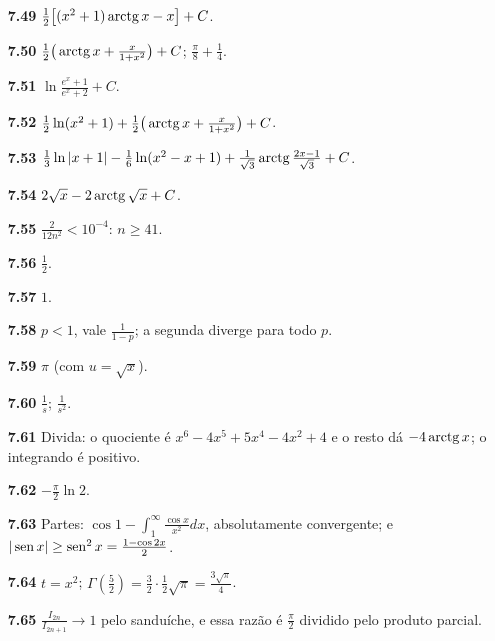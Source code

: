 {\begin{multicols}{2}
\begin{itemize}[leftmargin=2.7em,labelsep=0.5em,itemsep=1pt]
\item[\textbf{7.49}] $\tfrac12\big[(x^2+1)\operatorname{arctg} x-x\big]+C$.
\item[\textbf{7.50}] $\tfrac12\big(\operatorname{arctg} x+\tfrac x{1+x^2}\big)+C$; $\tfrac\pi8+\tfrac14$.
\item[\textbf{7.51}] $\ln\tfrac{e^x+1}{e^x+2}+C$.
\item[\textbf{7.52}] $\tfrac12\ln(x^2+1)+\tfrac12\big(\operatorname{arctg} x+\tfrac x{1+x^2}\big)+C$.
\item[\textbf{7.53}] $\tfrac13\ln|x+1|-\tfrac16\ln(x^2-x+1)+\tfrac1{\sqrt3}\operatorname{arctg}\tfrac{2x-1}{\sqrt3}+C$.
\item[\textbf{7.54}] $2\sqrt x-2\operatorname{arctg}\sqrt x+C$.
\item[\textbf{7.55}] $\tfrac{2}{12n^2}<10^{-4}$: $n\ge41$.
\item[\textbf{7.56}] $\tfrac12$.
\item[\textbf{7.57}] $1$.
\item[\textbf{7.58}] $p<1$, vale $\tfrac1{1-p}$; a segunda diverge para todo $p$.
\item[\textbf{7.59}] $\pi$ (com $u=\sqrt x$).
\item[\textbf{7.60}] $\tfrac1s$; $\tfrac1{s^2}$.
\item[\textbf{7.61}] Divida: o quociente é $x^6-4x^5+5x^4-4x^2+4$ e o resto dá $-4\operatorname{arctg} x$; o integrando é positivo.
\item[\textbf{7.62}] $-\tfrac\pi2\ln2$.
\item[\textbf{7.63}] Partes: $\cos1-\int_1^\infty\tfrac{\cos x}{x^2}dx$, absolutamente convergente; e $|\operatorname{sen} x|\ge\operatorname{sen}^2x=\tfrac{1-\cos2x}2$.
\item[\textbf{7.64}] $t=x^2$; $\Gamma(\tfrac52)=\tfrac32\cdot\tfrac12\sqrt\pi=\tfrac{3\sqrt\pi}4$.
\item[\textbf{7.65}] $\tfrac{I_{2n}}{I_{2n+1}}\to1$ pelo sanduíche, e essa razão é $\tfrac\pi2$ dividido pelo produto parcial.
\end{itemize}\end{multicols}}
